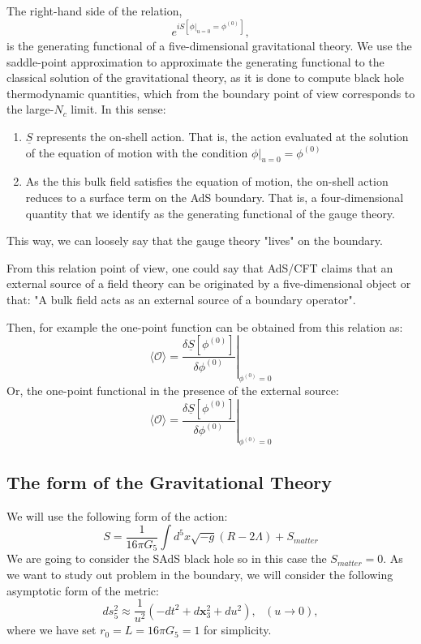 \documentclass[12pt]{article}
\begin{document}
The right-hand side of the relation,
\[
    e^{iS[\left.\phi\right|_{u=0}=\phi^{(0)}]},
\]
is the generating functional of a five-dimensional gravitational theory. We use the saddle-point approximation to approximate the generating functional to the classical solution of the gravitational theory, as it is done to compute black hole thermodynamic quantities, which from the boundary point of view corresponds to the large-$N_c$ limit. In this sense:
\begin{enumerate}
    \item $\underline{S}$ represents the on-shell action. That is, the action evaluated at the solution of the equation of motion with the condition $\left.\phi\right|_{u=0}=\phi^{(0)}$
    \item As the this bulk field satisfies the equation of motion, the on-shell action reduces to a surface term on the AdS boundary. That is, a four-dimensional quantity that we identify as the generating functional of the gauge theory.
\end{enumerate}

This way, we can loosely say that the gauge theory "lives" on the boundary.

\vspace{.25cm}

From this relation point of view, one could say that AdS/CFT claims that an external source of a field theory can be originated by a five-dimensional object or that: "A bulk field acts as an external source of a boundary operator".

Then, for example the one-point function can be obtained from this relation as:
\[
    \langle\mathcal{O}\rangle = \left.\frac{\delta \underline{S}[\phi^{(0)}]}{\delta\phi^{(0)}}\right|_{\phi^{(0)}=0}
\]
Or, the one-point functional in the presence of the external source:
\[
    \langle\mathcal{O}\rangle = \left.\frac{\delta \underline{S}[\phi^{(0)}]}{\delta\phi^{(0)}}\right|_{\phi^{(0)}=0}
\]

\subsection{The form of the Gravitational Theory}

We will use the following form of the action:
\[
    S = \frac{1}{16\pi G_5}\int d^5 x \sqrt{-g}(R-2\Lambda) + S_{matter}
\]We are going to consider the SAdS black hole so in this case the $S_{matter}=0$. As we want to study out problem in the boundary, we will consider the following asymptotic form of the metric:
\[
    ds_5^2\approx \frac{1}{u^2}(-dt^2 + d\mathbf{x}_3^2 + du^2), ~~~ (u\rightarrow 0),
\]
where we have set $r_0=L=16\pi G_5 = 1$ for simplicity. 
\end{document}
